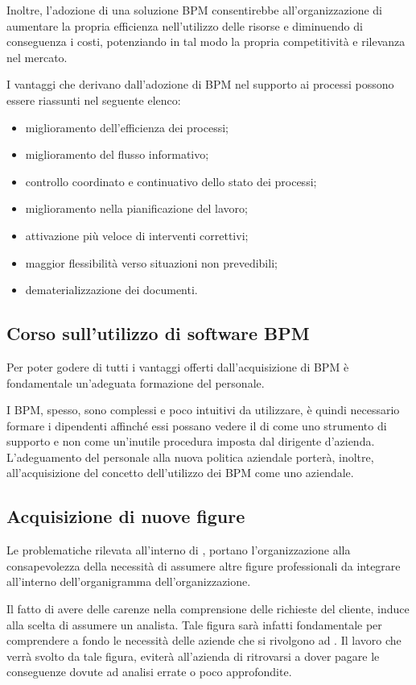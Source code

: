 Inoltre, l'adozione di una soluzione BPM consentirebbe all'organizzazione di aumentare la propria efficienza nell'utilizzo delle risorse e diminuendo di conseguenza i costi, potenziando in tal modo la propria competitività e rilevanza nel mercato.

I vantaggi che derivano dall'adozione di \sw BPM nel supporto ai processi possono essere riassunti nel seguente elenco:

\begin{itemize}
	\item miglioramento dell'efficienza dei processi;
	\item miglioramento del flusso informativo;
	\item controllo coordinato e continuativo dello stato dei processi;
	\item miglioramento nella pianificazione del lavoro;
	\item attivazione più veloce di interventi correttivi;
	\item maggior flessibilità verso situazioni non prevedibili;
	\item dematerializzazione dei documenti.
\end{itemize}


\subsection{Corso sull'utilizzo di software BPM}
Per poter godere di tutti i vantaggi offerti dall'acquisizione di \sw BPM è fondamentale un'adeguata formazione del personale.

I \sw BPM, spesso, sono complessi e poco intuitivi da utilizzare, è quindi necessario formare i dipendenti affinché essi possano 
vedere il \sw di  come uno strumento di supporto e non come un'inutile procedura imposta dal dirigente d'azienda.
L'adeguamento del personale alla nuova politica aziendale porterà, inoltre, all'acquisizione del concetto dell'utilizzo dei \sw BPM come uno  aziendale.

\subsection{Acquisizione di nuove figure}
Le problematiche rilevata all'interno di \customer , portano l'organizzazione alla consapevolezza della necessità di assumere altre figure professionali da integrare all'interno dell'organigramma dell'organizzazione.

Il fatto di avere delle carenze nella comprensione delle richieste del cliente, induce \customer alla scelta di assumere un analista. Tale figura sarà infatti fondamentale per comprendere a fondo le necessità delle aziende che si rivolgono ad \customer. Il lavoro che verrà svolto da tale figura, eviterà all'azienda di ritrovarsi a dover pagare le conseguenze dovute ad analisi errate o poco approfondite.


